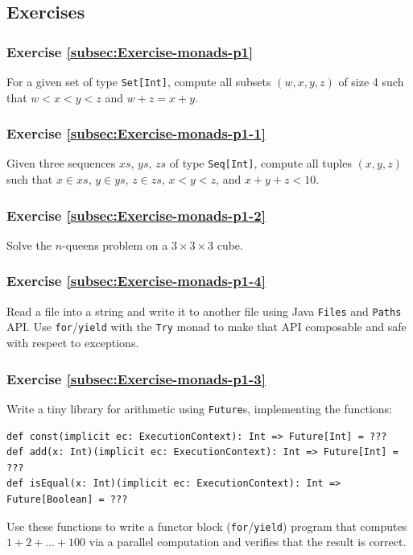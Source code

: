 \subsection{Exercises}

\subsubsection{Exercise \label{subsec:Exercise-monads-p1}\ref{subsec:Exercise-monads-p1}}

For a given set of type \lstinline!Set[Int]!, compute all subsets
$\left(w,x,y,z\right)$ of size 4 such that $w<x<y<z$ and $w+z=x+y$.

\subsubsection{Exercise \label{subsec:Exercise-monads-p1-1}\ref{subsec:Exercise-monads-p1-1}}

Given three sequences $xs$, $ys$, $zs$ of type \lstinline!Seq[Int]!,
compute all tuples $\left(x,y,z\right)$ such that $x\in xs$, $y\in ys$,
$z\in zs$, $x<y<z$, and $x+y+z<10$.

\subsubsection{Exercise \label{subsec:Exercise-monads-p1-2}\ref{subsec:Exercise-monads-p1-2}}

Solve the $n$-queens problem on a $3\times3\times3$ cube.

\subsubsection{Exercise \label{subsec:Exercise-monads-p1-4}\ref{subsec:Exercise-monads-p1-4}}

Read a file into a string and write it to another file using Java
\lstinline!Files! and \lstinline!Paths! API. Use \lstinline!for!/\lstinline!yield!
with the \lstinline!Try! monad to make that API composable and safe
with respect to exceptions.

\subsubsection{Exercise \label{subsec:Exercise-monads-p1-3}\ref{subsec:Exercise-monads-p1-3}}

Write a tiny library for arithmetic using \lstinline!Future!s, implementing
the functions:
\begin{lstlisting}
def const(implicit ec: ExecutionContext): Int => Future[Int] = ???
def add(x: Int)(implicit ec: ExecutionContext): Int => Future[Int] = ???
def isEqual(x: Int)(implicit ec: ExecutionContext): Int => Future[Boolean] = ??? 
\end{lstlisting}
Use these functions to write a functor block (\lstinline!for!/\lstinline!yield!)
program that computes $1+2+...+100$ via a parallel computation and
verifies that the result is correct.

